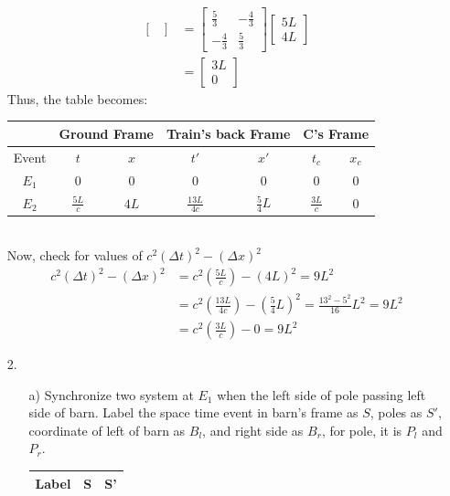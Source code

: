 \documentclass{article}
\begin{document}
\begin{itemize}
\begin{align*}
\begin{bmatrix}
        \end{bmatrix}&=\begin{bmatrix}
            \frac{5}{3}&-\frac{4}{3}\\
            -\frac{4}{3}&\frac{5}{3}
        \end{bmatrix}\begin{bmatrix}
            5L\\4L
        \end{bmatrix}\\
        &=\begin{bmatrix}
            3L\\0
        \end{bmatrix}
    \end{align*}
    Thus, the table becomes:\\
    \begin{tabular}{c | c c | c c | c c|}
        &\multicolumn{2}{c|}{Ground Frame}&\multicolumn{2}{c|}{Train's back Frame}&\multicolumn{2}{c|}{C's Frame}\\
        \hline Event& $t$&$x$&$t'$&$x'$&$t_c$&$x_c$\\
        $E_1$& 0&0&0&0&0&0\\ 
        $E_2$& $\frac{5L}{c}$&$4L$&$\frac{13L}{4c}$&$\frac{5}{4}L$&$\frac{3L}{c}$&0
    \end{tabular}\\
    Now, check for values of \(c^2(\Delta t)^2-(\Delta x)^2\)\\
    \begin{align*}
        c^2(\Delta t)^2-(\Delta x)^2&=c^2\left(\frac{5L}{c}\right)-\left(4L\right)^2= 9L^2\\
        &=c^2\left(\frac{13L}{4c}\right)-\left(\frac{5}{4}L\right)^2 = \frac{13^2-5^2}{16}L^2 = 9L^2\\
        &=c^2\left(\frac{3L}{c}\right)-0 = 9L^2
    \end{align*}
    \newpage
    \item [2.]
    \begin{itemize}
        \item [a)]
        Synchronize two system at \(E_1\) when the left side of pole passing left side of barn.
        Label the space time event in barn's frame as \(S\), poles as \(S'\), coordinate of left of barn as \(B_l\), and right side as \(B_r\), for pole, it is \(P_l \) and \(P_r\).
        \begin{table}[h]
            \centering
            \begin{tabular}{c c | c c | c c }
                \multicolumn{2}{c|}{Label }&\multicolumn{2}{c|}{S}&\multicolumn{2}{c}{S'}\\ \hline

\end{tabular}
\end{table}
\end{itemize}
\end{itemize}
\end{document}

